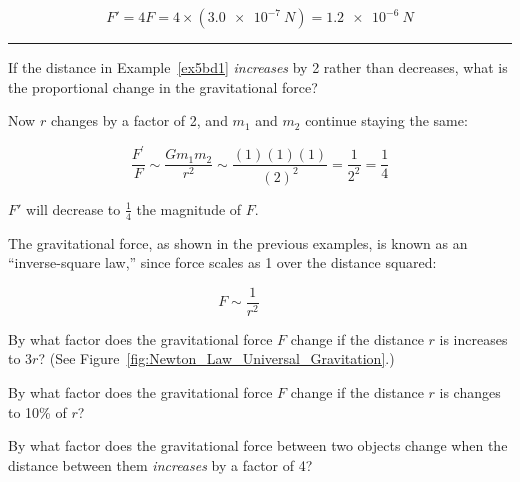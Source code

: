 \documentclass[dvipsnames]{article}
\numberwithin{equation}{section}
\numberwithin{figure}{section}
\begin{document}
\begin{equation*}
    F' = 4 F = 4 \times  \left(\SI{3.0e-7}{N}\right) = \SI{1.2e-6}{N}
\end{equation*}


\vspace{1em}
\hrule

\begin{example}
If the distance in Example~\ref{ex5bd1} \textit{increases} by 2 rather than decreases, what is the proportional change in the gravitational force?
\end{example} 

\Solution Now $r$ changes by a factor of 2, and $m_1$ and $m_2$ continue staying the same:

\begin{equation*}
    \frac{F^{\prime}}{F} \sim \frac{G m_1 m_2}{r^2} \sim \frac{(1)(1)(1)}{(2)^2} = \frac{1}{2^2} =\frac{1}{4}
\end{equation*}

$F'$ will decrease to $\frac{1}{4}$ the magnitude of $F$.

\vspace{1ex}
\cyanhrule
\vspace{1ex}

The gravitational force, as shown in the previous examples, is known as an ``inverse-square law,'' since force scales as 1 over the distance squared:

\begin{equation*} \tag{inverse-square law}
    F \sim \frac{1}{r^2} \hspace{3em}
\end{equation*}

\begin{exercise} \label{WhkfQ4}
By what factor does the gravitational force $F$ change if the distance $r$ is increases to $3r$? (See Figure~\ref{fig:Newton_Law_Universal_Gravitation}.) 
\end{exercise}

\begin{exercise} \label{CqOs7y}
By what factor does the gravitational force $F$ change if the distance $r$ is changes to 10\% of $r$? 
\end{exercise}

\begin{exercise} \label{PwaIbN}
By what factor does the gravitational force between two objects change when the distance between them \textit{increases} by a factor of 4?
\end{exercise}
\end{document}
